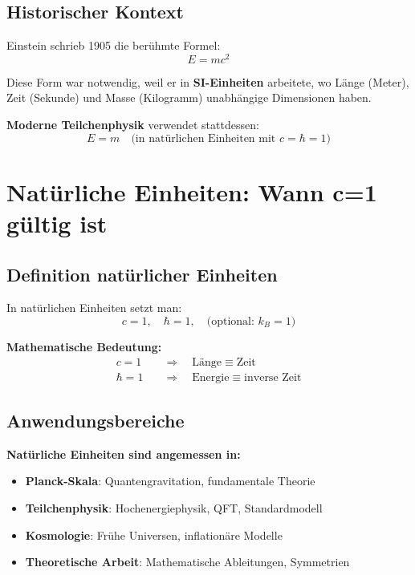 	\subsection{Historischer Kontext}
	
	Einstein schrieb 1905 die berühmte Formel:
	\begin{equation}
		E = mc^2
	\end{equation}
	
	Diese Form war notwendig, weil er in \textbf{SI-Einheiten} arbeitete, wo Länge (Meter), Zeit (Sekunde) und Masse (Kilogramm) unabhängige Dimensionen haben.
	
	\textbf{Moderne Teilchenphysik} verwendet stattdessen:
	\begin{equation}
		E = m \quad \text{(in natürlichen Einheiten mit } c=\hbar=1\text{)}
	\end{equation}
	
	\section{Natürliche Einheiten: Wann c=1 gültig ist}
	
	\subsection{Definition natürlicher Einheiten}
	
	In natürlichen Einheiten setzt man:
	\begin{equation}
		c = 1, \quad \hbar = 1, \quad \text{(optional: } k_B = 1 \text{)}
	\end{equation}
	
	\textbf{Mathematische Bedeutung:}
	\begin{align}
		c = 1 \quad &\Rightarrow \quad \text{Länge} \equiv \text{Zeit} \\
		\hbar = 1 \quad &\Rightarrow \quad \text{Energie} \equiv \text{inverse Zeit}
	\end{align}
	
	\subsection{Anwendungsbereiche}
	
	\textbf{Natürliche Einheiten sind angemessen in:}
	
	\begin{itemize}
		\item \textbf{Planck-Skala}: Quantengravitation, fundamentale Theorie
		\item \textbf{Teilchenphysik}: Hochenergiephysik, QFT, Standardmodell
		\item \textbf{Kosmologie}: Frühe Universen, inflationäre Modelle
		\item \textbf{Theoretische Arbeit}: Mathematische Ableitungen, Symmetrien
	\end{itemize}
	
